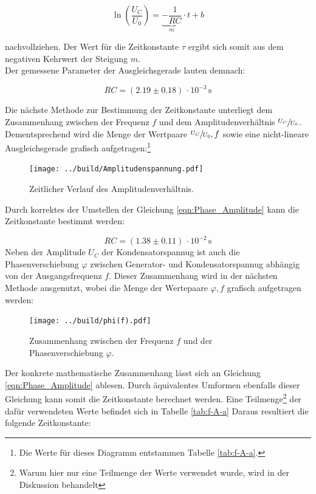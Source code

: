 \begin{equation}
    \ln\left(\frac{U_C}{U_0}\right) = \underbrace{-\frac{1}{RC}}_m \cdot t + b
\end{equation}

\noindent nachvollziehen. Der Wert für die Zeitkonstante $\tau$ ergibt sich somit aus dem negativen Kehrwert der Steigung $m$.\\
Der gemessene Parameter der Ausgleichsgerade lauten demnach:

\begin{equation}
    RC = \left(2.19 \pm 0.18\right)\,\cdot 10^{-3}\,\unit{\second}
\end{equation}

\noindent Die nächste Methode zur Bestimmung der Zeitkonstante unterliegt dem Zusammenhang zwischen der Frequenz $f$ und dem 
Amplitudenverhältnis $\sfrac{U_C}{U_0}$. Dementsprechend wird die Menge der Wertpaare ${\sfrac{U_C}{U_0},f}$ sowie eine 
nicht-lineare Ausgleichsgerade grafisch aufgetragen:\footnote{Die Werte für dieses Diagramm entstammen Tabelle \ref{tab:f-A-a}.}

\begin{figure}
    \centering
    \texttt{[image: ../build/Amplitudenspannung.pdf]}
    \caption{Zeitlicher Verlauf des Amplitudenverhältnis.}
    \label{fig:Amplitudenverlauf}
\end{figure}

\noindent Durch korrektes der Umstellen der Gleichung \eqref{eqn:Phase_Amplitude} kann die Zeitkonstante bestimmt werden:

\begin{equation}
    RC = \left(1.38 \pm 0.11\right)\,\cdot 10^{-2}\,\unit{\second}
\end{equation}
\newpage
\noindent Neben der Amplitude $U_C$ der Kondensatorspannug ist auch die Phasenverschiebung $\varphi$ zwischen Generator- und
Kondensatorspannug abhängig von der Ausgangsfrequenz $f$. Dieser Zusammenhang wird in der nächsten Methode ausgenutzt, wobei 
die Menge der Wertepaare ${\varphi , f}$ grafisch aufgetragen werden: 

\begin{figure}[H]
    \centering
    \texttt{[image: ../build/phi(f).pdf]}
    \caption{Zusammenhang zwischen der Frequenz $f$ und der Phasenverschiebung $\varphi$.}
    \label{fig:Phasenverschiebung}
\end{figure}

\noindent Der konkrete mathematische Zusammenhang lässt sich an 
Gleichung \eqref{eqn:Phase_Amplitude} ablesen. Durch äquivalentes Umformen ebenfalls dieser Gleichung kann somit die Zeitkonstante
berechnet werden. Eine Teilmenge\footnote{Warum hier nur eine Teilmenge der Werte verwendet wurde, wird in der Diskussion behandelt} der dafür verwendeten Werte befindet sich in Tabelle \ref{tab:f-A-a}
Daraus resultiert die folgende Zeitkonstante:

